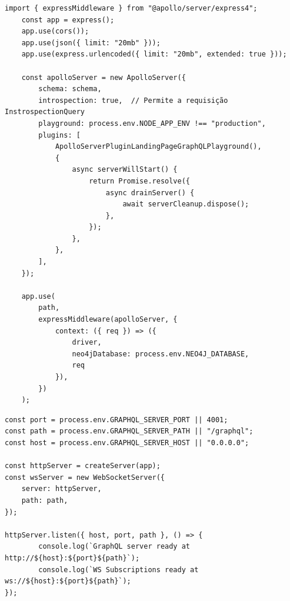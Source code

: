 \begin{lstlisting}
import { expressMiddleware } from "@apollo/server/express4";
    const app = express();
    app.use(cors());
    app.use(json({ limit: "20mb" }));
    app.use(express.urlencoded({ limit: "20mb", extended: true }));
    
	const apolloServer = new ApolloServer({
		schema: schema,
		introspection: true,  // Permite a requisição InstrospectionQuery
		playground: process.env.NODE_APP_ENV !== "production",
		plugins: [
			ApolloServerPluginLandingPageGraphQLPlayground(),
			{
				async serverWillStart() {
					return Promise.resolve({
						async drainServer() {
							await serverCleanup.dispose();
						},
					});
				},
			},
		],
	});

	app.use(
		path,
		expressMiddleware(apolloServer, {
			context: ({ req }) => ({
				driver,
				neo4jDatabase: process.env.NEO4J_DATABASE,
				req
			}),
		})
	);
\end{lstlisting}


\begin{lstlisting}
const port = process.env.GRAPHQL_SERVER_PORT || 4001;
const path = process.env.GRAPHQL_SERVER_PATH || "/graphql";
const host = process.env.GRAPHQL_SERVER_HOST || "0.0.0.0";

const httpServer = createServer(app);
const wsServer = new WebSocketServer({
	server: httpServer,
	path: path,
});

httpServer.listen({ host, port, path }, () => {
		console.log(`GraphQL server ready at http://${host}:${port}${path}`);
		console.log(`WS Subscriptions ready at ws://${host}:${port}${path}`);
});


\end{lstlisting}



